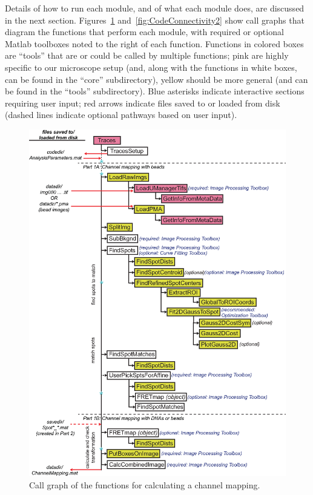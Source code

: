 \documentclass[11pt]{article}
\begin{document}
Details of how to run each module, and of what each module does, are discussed in the next section.  Figures~\ref{fig:CodeConnectivity1} and~\ref{fig:CodeConnectivity2} show call graphs that diagram the functions that perform each module, with required or optional Matlab toolboxes noted to the right of each function. Functions in colored boxes are ``tools'' that are or could be called by multiple functions; pink are highly specific to our microscope setup (and, along with the functions in white boxes, can be found in the ``core'' subdirectory), yellow should be more general (and can be found in the ``tools'' subdirectory).  Blue asterisks indicate interactive sections requiring user input; red arrows indicate files saved to or loaded from disk (dashed lines indicate optional pathways based on user input).

\begin{figure}[!p]
\begin{center}
\includegraphics[width=6in]{TracesFlowchart.eps}
\caption{Call graph of the functions for calculating a channel mapping.}
\label{fig:CodeConnectivity1}
\end{center}
\end{figure}
\end{document}
